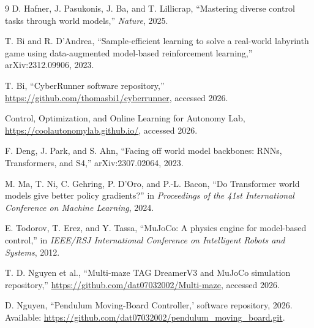 \documentclass[9pt]{extarticle}
\begin{document}
\begin{thebibliography}{9}
\scriptsize
\setlength{\itemsep}{0pt}
\setlength{\parskip}{0pt}
D. Hafner, J. Pasukonis, J. Ba, and T. Lillicrap, ``Mastering diverse control tasks through world models,'' \emph{Nature}, 2025.

T. Bi and R. D'Andrea, ``Sample-efficient learning to solve a real-world labyrinth game using data-augmented model-based reinforcement learning,'' arXiv:2312.09906, 2023.

T. Bi, ``CyberRunner software repository,'' \url{https://github.com/thomasbi1/cyberrunner}, accessed 2026.

Control, Optimization, and Online Learning for Autonomy Lab, \url{https://coolautonomylab.github.io/}, accessed 2026.

F. Deng, J. Park, and S. Ahn, ``Facing off world model backbones: RNNs, Transformers, and S4,'' arXiv:2307.02064, 2023.

M. Ma, T. Ni, C. Gehring, P. D'Oro, and P.-L. Bacon, ``Do Transformer world models give better policy gradients?'' in \emph{Proceedings of the 41st International Conference on Machine Learning}, 2024.


E. Todorov, T. Erez, and Y. Tassa, ``MuJoCo: A physics engine for model-based control,'' in \emph{IEEE/RSJ International Conference on Intelligent Robots and Systems}, 2012.

T. D. Nguyen et al., ``Multi-maze TAG DreamerV3 and MuJoCo simulation repository,'' \url{https://github.com/dat07032002/Multi-maze}, accessed 2026.

D. Nguyen, ``Pendulum Moving-Board Controller,' software repository, 2026. Available: \url{https://github.com/dat07032002/pendulum_moving_board.git}.

\end{thebibliography}
\end{document}
